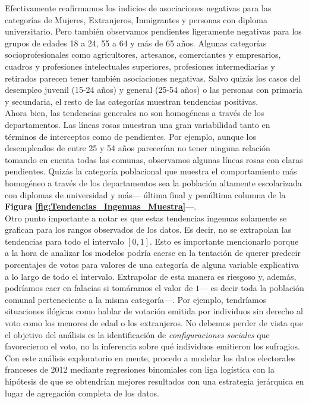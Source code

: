 Efectivamente reafirmamos los indicios de asociaciones negativas para las categorías de Mujeres, Extranjeros, Inmigrantes y personas con diploma universitario. Pero también observamos pendientes ligeramente negativas para los grupos de edades 18 a 24, 55 a 64 y más de 65 años. Algunas categorías socioprofesionales como agricultores, artesanos, comerciantes y empresarios, cuadros y profesiones intelectuales superiores, profesiones intermediarias y retirados parecen tener también asociaciones negativas. Salvo quizás los casos del desempleo juvenil (15-24 años) y general (25-54 años) o las personas con primaria y secundaria, el resto de las categorías muestran tendencias positivas.\\

Ahora bien, las tendencias generales no son homogéneas a través de los departamentos. Las líneas rosas muestran una gran variabilidad tanto en términos de interceptos como de pendientes. Por ejemplo, aunque los desempleados de entre 25 y 54 años parecerían no tener ninguna relación tomando en cuenta todas las comunas, observamos algunas líneas rosas con claras pendientes. Quizás la categoría poblacional que muestra el comportamiento más homogéneo a través de los departamentos sea la población altamente escolarizada con diplomas de universidad y más--- última final y penúltima columna de la \textbf{Figura \ref{fig:Tendencias_Ingenuas_Muestra}}---.\\

Otro punto importante a notar es que estas tendencias ingenuas solamente se grafican para los rangos observados de los datos. Es decir, no se extrapolan las tendencias para todo el intervalo $[0,1]$. Esto es importante mencionarlo porque a la hora de analizar los modelos podría caerse en la tentación de querer predecir porcentajes de votos para valores de una categoría de alguna variable explicativa a lo largo de todo el intervalo. Extrapolar de esta manera es riesgoso y, además, podríamos caer en falacias si tomáramos el valor de $1$--- es decir toda la población comunal perteneciente a la misma categoría---. Por ejemplo, tendríamos situaciones ilógicas como hablar de votación emitida por individuos sin derecho al voto como los menores de edad o los extranjeros. No debemos perder de vista que el objetivo del análisis es la identificación de \textit{configuraciones sociales} que favorecieron el voto, no la inferencia sobre qué individuos emitieron los sufragios.\label{No_Extrapolar}\\

Con este análisis exploratorio en mente, procedo a modelar los datos electorales franceses de 2012 mediante regresiones binomiales con liga logística con la hipótesis de que se obtendrían mejores resultados con una estrategia jerárquica en lugar de agregación completa de los datos. 

